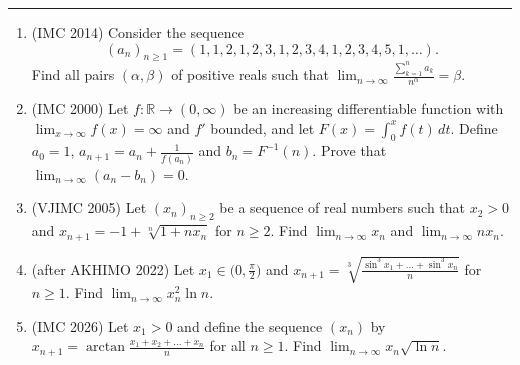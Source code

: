 \documentclass[11pt,a4paper]{article}
\renewcommand{\ge}{\geqslant}
\begin{document}
\noindent\rule{\textwidth}{0.4pt}\par\vspace{8.4pt}
\begin{enumerate}
\item (IMC 2014) Consider the sequence
\[
(a_n)_{n\ge1}=(1,1,2,1,2,3,1,2,3,4,1,2,3,4,5,1,\dots).
\]
Find all pairs $(\alpha,\beta)$ of positive reals such that
$\lim_{n\to\infty}\frac{\sum_{k=1}^na_k}{n^\alpha}=\beta$.

\newpage
\item (IMC 2000) Let $f\colon\mathbb R\to(0,\infty)$ be an increasing differentiable function with
$\lim_{x\to\infty}f(x)=\infty$ and $f'$ bounded, and let $F(x)=\int_0^xf(t)\,dt$. Define $a_0=1$,
$a_{n+1}=a_n+\frac1{f(a_n)}$ and $b_n=F^{-1}(n)$. Prove that $\lim_{n\to\infty}(a_n-b_n)=0$.

\item (VJIMC 2005) Let $(x_n)_{n\ge2}$ be a sequence of real numbers such that $x_2>0$ and
$x_{n+1}=-1+\sqrt[n]{1+nx_n}$ for $n\ge2$. Find $\lim_{n\to\infty}x_n$ and
$\lim_{n\to\infty}nx_n$.

\item (after AKHIMO 2022) Let $x_1\in\bigl(0,\frac\pi2\bigr)$ and
$x_{n+1}=\sqrt[3]{\frac{\sin^3x_1+\dots+\sin^3x_n}n}$ for $n\ge1$. Find
$\lim_{n\to\infty}x_n^2\ln n$.

\item (IMC 2026) Let $x_1>0$ and define the sequence $(x_n)$ by
$x_{n+1}=\arctan\frac{x_1+x_2+\dots+x_n}n$ for all $n\ge1$. Find
$\lim_{n\to\infty}x_n\sqrt{\ln n}$.
\end{enumerate}
\end{document}
